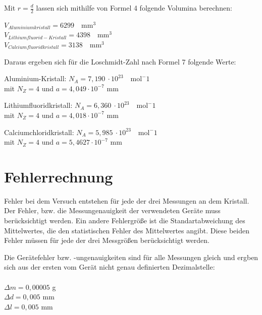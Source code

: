 \documentclass[12pt,a4paper,titlepage,headinclude,bibtotoc]{scrartcl}
\begin{document}
Mit $r=\frac{d}{2}$ lassen sich mithilfe von Formel 4 folgende Volumina berechnen:

\vspace{3mm}
$V_{Aluminiumkristall} = 6299 \quad \mathrm{mm^3}$\\
$V_{Lithiumfluorid-Kristall} =4398 \quad \mathrm{mm^3}$\\
$V_{Calciumfluoridkristall} = 3138 \quad \mathrm{mm^3}$\\

\vspace{3mm}

Daraus ergeben sich für die Loschmidt-Zahl nach Formel 7 folgende Werte:
\vspace{3mm}

Aluminium-Kristall: \qquad $N_A = 7,190 \ \cdot 10^{23} \quad \mathrm{mol^-1}$\\
mit $N_Z =4$ und $a=4,049\cdot 10^{-7} $ mm\\
\vspace{3mm}

Lithiumfluoridkristall: \qquad $N_A = 6,360 \ \cdot 10^{23} \quad\mathrm{mol^-1}$\\
mit $N_Z =4$ und $a=4,018\cdot 10^{-7} $ mm\\
\vspace{3mm}

Calciumchloridkristall: \qquad $N_A = 5,985 \ \cdot 10^{23} \quad\mathrm{mol^-1}$\\
mit $N_Z =4$ und $a=5,4627\cdot 10^{-7} $ mm\\
\vspace{3mm}


\section{Fehlerrechnung}
Fehler bei dem Versuch entstehen für jede der drei Messungen an dem Kristall. Der Fehler, bzw. die Messungenauigkeit der verwendeten Geräte muss berücksichtigt werden. Ein andere Fehlergröße ist die Standartabweichung des Mittelwertes, die den statistischen Fehler des Mittelwertes angibt. 
Diese beiden Fehler müssen für jede der drei Messgrößen berücksichtigt werden.

Die Gerätefehler bzw. -ungenauigkeiten sind für alle Messungen gleich und ergben sich aus der ersten vom Gerät nicht genau definierten Dezimalstelle:
\\
\\
$\Delta m = 0,00005$ g \\
$\Delta d = 0,005$ mm\\
$\Delta l = 0,005 $ mm\\
\\
\end{document}
